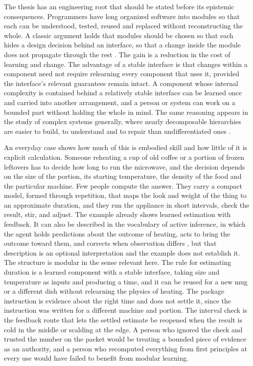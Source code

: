 \documentclass[12pt, a4paper]{article}
\begin{document}
The thesis has an engineering root that should be stated before its epistemic consequences. Programmers have long organized software into modules so that each can be understood, tested, reused and replaced without reconstructing the whole. A classic argument holds that modules should be chosen so that each hides a design decision behind an interface, so that a change inside the module does not propagate through the rest \citep{parnas1972}. The gain is a reduction in the cost of learning and change. The advantage of a stable interface is that changes within a component need not require relearning every component that uses it, provided the interface's relevant guarantees remain intact. A component whose internal complexity is contained behind a relatively stable interface can be learned once and carried into another arrangement, and a person or system can work on a bounded part without holding the whole in mind. The same reasoning appears in the study of complex systems generally, where nearly decomposable hierarchies are easier to build, to understand and to repair than undifferentiated ones \citep{simon1962}.

An everyday case shows how much of this is embodied skill and how little of it is explicit calculation. Someone reheating a cup of old coffee or a portion of frozen leftovers has to decide how long to run the microwave, and the decision depends on the size of the portion, its starting temperature, the density of the food and the particular machine. Few people compute the answer. They carry a compact model, formed through repetition, that maps the look and weight of the thing to an approximate duration, and they run the appliance in short intervals, check the result, stir, and adjust. The example already shows learned estimation with feedback. It can also be described in the vocabulary of active inference, in which the agent holds predictions about the outcome of heating, acts to bring the outcome toward them, and corrects when observation differs \citep{friston2010,parr2022}, but that description is an optional interpretation and the example does not establish it. The structure is modular in the sense relevant here. The rule for estimating duration is a learned component with a stable interface, taking size and temperature as inputs and producing a time, and it can be reused for a new mug or a different dish without relearning the physics of heating. The package instruction is evidence about the right time and does not settle it, since the instruction was written for a different machine and portion. The interval check is the feedback route that lets the settled estimate be reopened when the result is cold in the middle or scalding at the edge. A person who ignored the check and trusted the number on the packet would be treating a bounded piece of evidence as an authority, and a person who recomputed everything from first principles at every use would have failed to benefit from modular learning.
\end{document}
